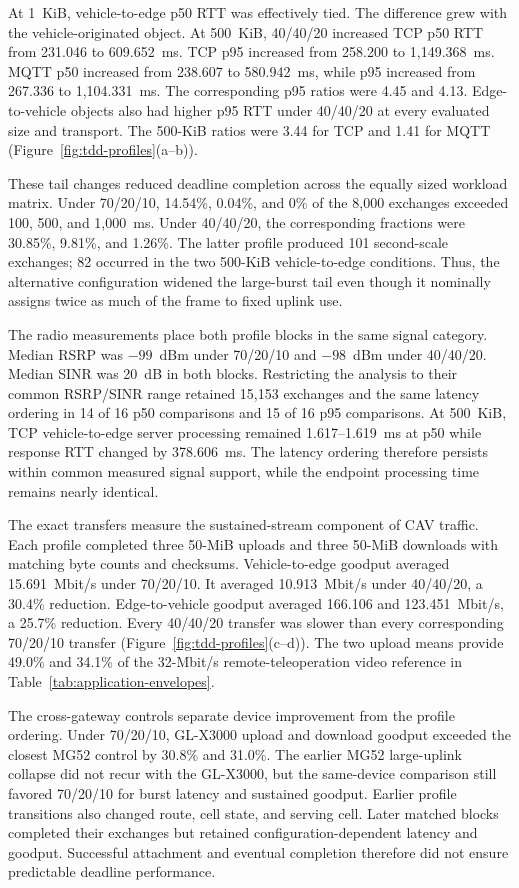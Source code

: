 At 1~KiB, vehicle-to-edge p50 RTT was effectively tied. The difference grew
with the vehicle-originated object. At 500~KiB, 40/40/20 increased TCP p50 RTT
from 231.046 to 609.652~ms. TCP p95 increased from 258.200 to
1,149.368~ms. MQTT p50 increased from 238.607 to 580.942~ms, while p95
increased from 267.336 to 1,104.331~ms. The corresponding p95 ratios were 4.45
and 4.13. Edge-to-vehicle objects also had higher p95 RTT under 40/40/20
at every evaluated size and transport. The 500-KiB ratios were 3.44 for TCP
and 1.41 for MQTT (Figure~\ref{fig:tdd-profiles}(a--b)).

These tail changes reduced deadline completion across the equally sized
workload matrix. Under 70/20/10, 14.54\%, 0.04\%, and 0\% of the 8,000
exchanges exceeded 100, 500, and 1,000~ms. Under 40/40/20, the corresponding
fractions were 30.85\%, 9.81\%, and 1.26\%. The latter profile produced 101
second-scale exchanges; 82 occurred in the two 500-KiB vehicle-to-edge
conditions. Thus, the alternative configuration widened the large-burst tail
even though it nominally assigns twice as much of the frame to fixed uplink
use.

The radio measurements place both profile blocks in the same signal category.
Median RSRP was $-99$~dBm under 70/20/10 and $-98$~dBm under 40/40/20. Median
SINR was 20~dB in both blocks. Restricting the analysis to their common
RSRP/SINR range retained 15,153 exchanges and the same latency ordering in 14
of 16 p50 comparisons and 15 of 16 p95 comparisons. At 500~KiB, TCP
vehicle-to-edge server processing remained 1.617--1.619~ms at p50 while
response RTT changed by 378.606~ms. The latency ordering therefore persists
within common measured signal support, while the endpoint processing time
remains nearly identical.

The exact transfers measure the sustained-stream component of CAV traffic.
Each profile completed three 50-MiB uploads and three 50-MiB downloads with
matching byte counts and checksums. Vehicle-to-edge goodput averaged
15.691~Mbit/s under 70/20/10. It averaged 10.913~Mbit/s under 40/40/20, a
30.4\% reduction. Edge-to-vehicle goodput averaged 166.106 and
123.451~Mbit/s, a 25.7\% reduction. Every 40/40/20 transfer was slower than every corresponding
70/20/10 transfer (Figure~\ref{fig:tdd-profiles}(c--d)). The two upload means
provide 49.0\% and 34.1\% of the 32-Mbit/s remote-teleoperation video reference
in Table~\ref{tab:application-envelopes}.

The cross-gateway controls separate device improvement from the profile
ordering. Under 70/20/10, GL-X3000 upload and download goodput exceeded the
closest MG52 control by 30.8\% and 31.0\%. The earlier MG52 large-uplink collapse
did not recur with the GL-X3000, but the same-device comparison still favored
70/20/10 for burst latency and sustained goodput. Earlier profile transitions
also changed route, cell state, and serving cell. Later matched blocks completed
their exchanges but retained configuration-dependent latency and goodput.
Successful attachment and eventual completion therefore did not ensure
predictable deadline performance.

